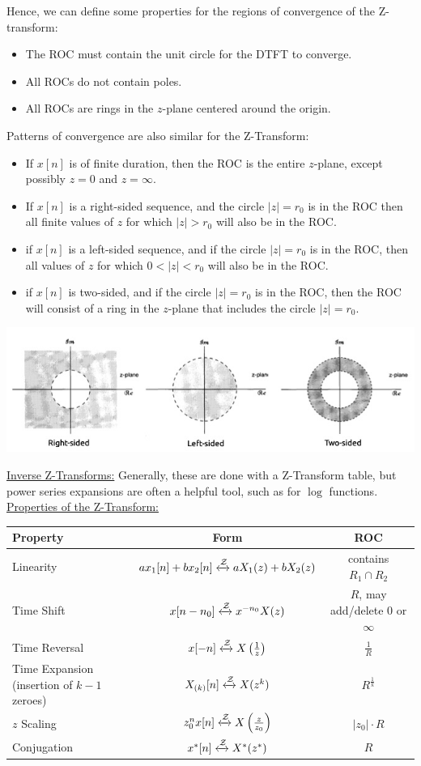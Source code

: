 \documentclass{article}
\newcommand{\sheader}[1]{\underline{#1:}}
\newcommand{\gap}{\medskip\\}
\newcommand{\zarrow}{\xleftrightarrow{\mathcal{Z}}}
\begin{document}
Hence, we can define some properties for the regions of convergence of the Z-transform:
\begin{itemize}
    \item The ROC must contain the unit circle for the DTFT to converge.
    \item All ROCs do not contain poles.
    \item All ROCs are rings in the $z$-plane centered around the origin.
\end{itemize}
Patterns of convergence are also similar for the Z-Transform:
\begin{itemize}
    \item If $x[n]$ is of finite duration, then the ROC is the entire $z$-plane,
            except possibly $z = 0$ and $z = \infty$.
    \item If $x[n]$ is a right-sided sequence, and the circle $|z| = r_0$ is in the ROC
            then all finite values of $z$ for which $|z| > r_0$ will also be in the ROC.
    \item if $x[n]$ is a left-sided sequence, and if the circle $|z| = r_0$ is in the ROC,
            then all values of $z$ for which $0 < |z| < r_0$ will also be in the ROC.
    \item if $x[n]$ is two-sided, and if the circle $|z| = r_0$ is in the ROC,
            then the ROC will consist of a ring in the $z$-plane that includes the circle 
            $|z| = r_0$.
\end{itemize}
\begin{center}
    \includegraphics[scale=0.6]{z-roc-cases.jpg}
\end{center}
\sheader{Inverse Z-Transforms} Generally, these are done with a Z-Transform table, but
power series expansions are often a helpful tool, such as for $\log$ functions.
\gap
\sheader{Properties of the Z-Transform}\\
\begin{tabular}{ | l | c | c | }
    \hline
    Property & Form & ROC\\
    \hline
    Linearity & $ax_1[n] + bx_2[n] \zarrow aX_1(z) + bX_2(z)$ & contains $R_1 \cap R_2$\\
    \hline
    Time Shift & $x[n - n_0] \zarrow x^{-n_0}X(z)$ & $R$, may add/delete $0$ or $\infty$\\
    \hline
    Time Reversal & $x[-n] \zarrow X\left(\frac{1}{z}\right)$ & $\frac{1}{R}$\\
    \hline
    Time Expansion (insertion of $k-1$ zeroes) & $X_{(k)}[n] \zarrow X(z^k)$ & $R^{\frac{1}{k}}$\\
    \hline
    $z$ Scaling & $z_0^n x[n] \zarrow X\left(\frac{z}{z_0}\right) $ & $|z_0|\cdot R$\\
    \hline
    Conjugation & $x^*[n] \zarrow X^*(z^*)$ & $R$\\
    \hline
\end{tabular}
\end{document}
